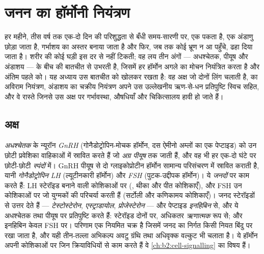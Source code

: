 \chapter{जनन का हॉर्मोनी नियंत्रण}\label{ch:b2:reproductive-hormones}

हर महीने, तीस वर्ष तक एक-दो दिन की परिशुद्धता से बँधी समय-सारणी पर,
एक  पकता है, एक अंडाणु छोड़ा जाता है, गर्भाशय का अस्तर
बनाया जाता है और फिर, जब तक कोई भ्रूण न आ पहुँचे, ढहा दिया जाता है।
शरीर की कोई घड़ी इस दर से नहीं टिकती; वह लय तीन अंगों --- अधश्चेतक,
पीयूष और अंडाशय --- के बीच की बातचीत से उभरती है, जिसमें हर हॉर्मोन
अगले का मोचन नियंत्रित करता है और अंतिम पहले को। यह अध्याय
उस बातचीत को खोलकर रखता है: वह अक्ष जो दोनों लिंग चलाती है,
 का अविराम नियंत्रण, अंडाशय का चक्रीय नियंत्रण अपने उस
उल्लेखनीय ऋण-से-धन प्रतिपुष्टि स्विच सहित, और वे रास्ते जिनसे उस अक्ष
पर गर्भावस्था, औषधियाँ और चिकित्सालय हावी हो जाते हैं।

\section{अक्ष}

\begin{definition}\label{def:b2:reproductive-hormones:axis}
\emph{अधश्चेतक} के न्यूरॉन \emph{GnRH}
(गोनैडोट्रोपिन-मोचक हॉर्मोन, दस ऐमीनो अम्लों का एक पेप्टाइड) को उन छोटी
प्रवेशिका वाहिकाओं में स्रावित करते हैं जो \emph{अग्र पीयूष} तक जाती
हैं, और वह भी हर एक-दो घंटे पर छोटी-छोटी \emph{स्पंदों} में। GnRH
पीयूष से दो ग्लाइकोप्रोटीन हॉर्मोन सामान्य परिसंचरण में स्रावित कराती
है, यानी \emph{गोनैडोट्रोपिन} \emph{LH} (ल्यूटीनकारी
हॉर्मोन) और \emph{FSH} (पुटक-उद्दीपक हॉर्मोन)। ये \emph{जनदों} पर काम
करते हैं: LH स्टेरॉइड बनाने वाली कोशिकाओं पर (,
थीका और पीत कोशिकाएँ), और FSH उन कोशिकाओं पर जो युग्मकों की परिचर्या
करती हैं (सर्टोली और कणिकामय कोशिकाएँ)। जनद स्टेरॉइडों से उत्तर देते
हैं --- \emph{टेस्टोस्टेरोन}, \emph{एस्ट्राडायोल},
\emph{प्रोजेस्टेरोन} --- और पेप्टाइड \emph{इनहिबिन} से, और ये
अधश्चेतक तथा पीयूष पर प्रतिपुष्टि करते हैं: स्टेरॉइड दोनों पर, अधिकतर
\emph{ऋणात्मक} रूप से; और इनहिबिन केवल FSH पर। परिणाम एक नियमित
चक्र है जिसमें जनद का निर्गत किसी नियत बिंदु पर रखा जाता है, और यही
तीन-तल्ला अभिकल्प अवटु ग्रंथि तथा अधिवृक्क वल्कुट भी चलाता है। ये
हॉर्मोन अपनी कोशिकाओं पर जिन क्रियाविधियों से काम करते हैं वे
\cref{ch:b2:cell-signalling} का विषय हैं।
\end{definition}

